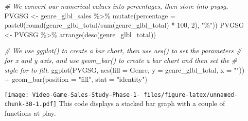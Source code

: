 \documentclass[
]{article}
\newenvironment{Shaded}{\begin{snugshade}}{\end{snugshade}}
\newcommand{\AttributeTok}[1]{\textcolor[rgb]{0.77,0.63,0.00}{#1}}
\newcommand{\CommentTok}[1]{\textcolor[rgb]{0.56,0.35,0.01}{\textit{#1}}}
\newcommand{\DecValTok}[1]{\textcolor[rgb]{0.00,0.00,0.81}{#1}}
\newcommand{\FunctionTok}[1]{\textcolor[rgb]{0.00,0.00,0.00}{#1}}
\newcommand{\NormalTok}[1]{#1}
\newcommand{\OtherTok}[1]{\textcolor[rgb]{0.56,0.35,0.01}{#1}}
\newcommand{\SpecialCharTok}[1]{\textcolor[rgb]{0.00,0.00,0.00}{#1}}
\newcommand{\StringTok}[1]{\textcolor[rgb]{0.31,0.60,0.02}{#1}}
\begin{document}
\begin{Shaded}
\begin{Highlighting}[]
\CommentTok{\# We convert our numerical values into percentages, then store into pvgsg.}
\NormalTok{PVGSG }\OtherTok{\textless{}{-}}\NormalTok{ genre\_glbl\_sales }\SpecialCharTok{\%\textgreater{}\%}
    \FunctionTok{mutate}\NormalTok{(}\AttributeTok{percentage =} \FunctionTok{paste0}\NormalTok{(}\FunctionTok{round}\NormalTok{(genre\_glbl\_total}\SpecialCharTok{/}\FunctionTok{sum}\NormalTok{(genre\_glbl\_total) }\SpecialCharTok{*} \DecValTok{100}\NormalTok{,}
        \DecValTok{2}\NormalTok{), }\StringTok{"\%"}\NormalTok{))}
\NormalTok{PVGSG }\OtherTok{\textless{}{-}}\NormalTok{ PVGSG }\SpecialCharTok{\%\textgreater{}\%}
    \FunctionTok{arrange}\NormalTok{(}\FunctionTok{desc}\NormalTok{(genre\_glbl\_total))}

\CommentTok{\# We use ggplot() to create a bar chart, then use aes() to set the parameters}
\CommentTok{\# for x and y axis, and use geom\_bar() to create a bar chart and then set the}
\CommentTok{\# style for to fill.}
\FunctionTok{ggplot}\NormalTok{(PVGSG, }\FunctionTok{aes}\NormalTok{(}\AttributeTok{fill =}\NormalTok{ Genre, }\AttributeTok{y =}\NormalTok{ genre\_glbl\_total, }\AttributeTok{x =} \StringTok{""}\NormalTok{)) }\SpecialCharTok{+} \FunctionTok{geom\_bar}\NormalTok{(}\AttributeTok{position =} \StringTok{"fill"}\NormalTok{,}
    \AttributeTok{stat =} \StringTok{"identity"}\NormalTok{)}
\end{Highlighting}
\end{Shaded}

\texttt{[image: Video-Game-Sales-Study--Phase-1-\_files/figure-latex/unnamed-chunk-38-1.pdf]}
This code displays a stacked bar graph with a couple of functions at
play.
\end{document}

